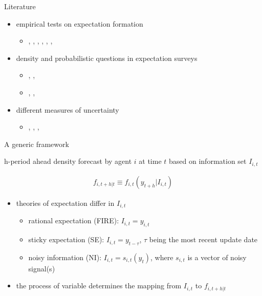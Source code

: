 \documentclass{beamer}
\begin{document}
\begin{frame}{Literature}
\begin{itemize}
	\item empirical tests on expectation formation
	\begin{itemize}
		\item \citet{mankiw2003disagreement}, \citet{carroll2003macroeconomic}, \citet{branch2004theory}, \citet{malmendier2015learning}, \citet{das2017socioeconomic}, \citet{coibion2012can}, \citet{fuhrer2018intrinsic} 
	\end{itemize}
    \item density and probabilistic questions in expectation surveys
    \begin{itemize}
    	\item  \citet{manski2004measuring}, \citet{delavande2011measuring}, \citet{manski2018survey} 
    	\item  \citet{bertrand2001people},  \citet{van2008rethinking},  \citet{delavande2014probabilistic}
    \end{itemize}
    \item different measures of uncertainty
    \begin{itemize}
    	\item \citet{bachmann2013uncertainty},  \citet{jurado2015measuring}, \citet{binder2017measuring},  \citet{bloom2009impact}
    \end{itemize}
\end{itemize}
\end{frame}

\begin{frame}{A generic framework}
	
	h-period ahead density forecast by agent $i$ at time $t$ based on information set $I_{i,t}$
	
	\begin{eqnarray*}
		f_{i,t+h|t} \equiv f_{i,t}(y_{t+h}|I_{i,t})
	\end{eqnarray*}
	
	\begin{itemize}
		\item theories of expectation differ in $I_{i,t}$ 
		\begin{itemize}
			\item rational expectation (FIRE): $I_{i,t} = y_{i,t}$
			\item sticky expectation (SE):  $I_{i,t} = y_{t-\tau}$, $\tau$ being the most recent update date
			\item noisy information (NI): $I_{i,t} = s_{i,t}(y_t)$, where $s_{i,t}$ is a vector of noisy signal(s)
		\end{itemize}
		\item the process of variable determines the mapping from $I_{i,t}$ to $f_{i,t+h|t}$
	\end{itemize}
\end{frame}
\end{document}
